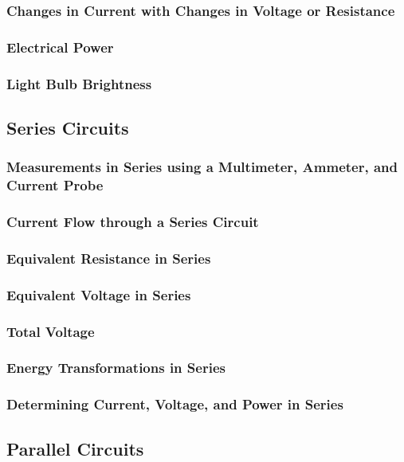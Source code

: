 \documentclass[../main-physics-problems.tex]{subfiles}
\begin{document}
\subsubsection{Changes in Current with Changes in Voltage or Resistance}
\subsubsection{Electrical Power}
\subsubsection{Light Bulb Brightness}

\clearpage

\subsection{Series Circuits}
\subsubsection{Measurements in Series using a Multimeter, Ammeter, and Current Probe}
\subsubsection{Current Flow through a Series Circuit}
\subsubsection{Equivalent Resistance in Series}
\subsubsection{Equivalent Voltage in Series}
\subsubsection{Total Voltage}
\subsubsection{Energy Transformations in Series}
\subsubsection{Determining Current, Voltage, and Power in Series}

\clearpage

\subsection{Parallel Circuits}
\end{document}
